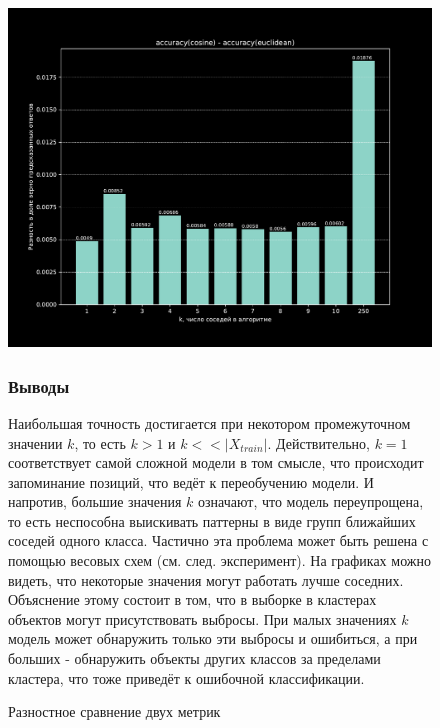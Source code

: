 \documentclass{article}
\begin{document}
                \begin{figure}[H]
                    \centering
                    \includegraphics[width=0.8\linewidth]{./pictures/Delta.pdf}
                    \caption{Разностное сравнение двух метрик}
        \subsubsection{Выводы}
                Наибольшая точность достигается при некотором промежуточном значении $k$, то есть $k > 1$ и $k << |X_{train}|$.
                Действительно, $k=1$ соответствует самой сложной модели в том смысле, что происходит запоминание позиций, что ведёт к переобучению модели.
                И напротив, большие значения $k$ означают, что модель переупрощена, то есть неспособна выискивать паттерны в виде групп ближайших соседей одного класса.
                Частично эта проблема может быть решена с помощью весовых схем (см. след. эксперимент).
                На графиках можно видеть, что некоторые значения могут работать лучше соседних.
                Объяснение этому состоит в том, что в выборке в кластерах объектов могут присутствовать выбросы.
                При малых значениях $k$ модель может обнаружить только эти выбросы и ошибиться, а при больших - обнаружить объекты других классов за пределами кластера, что тоже приведёт к ошибочной классификации.


\end{figure}
\end{document}
